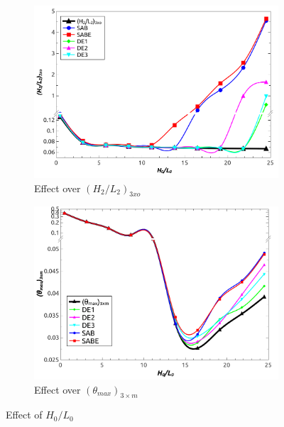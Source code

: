 \documentclass[10pt,fleqn,a4paper,twoside]{article}
\begin{document}
\begin{figure}[h]
\centering
	\begin{subfigure}{0.52\textwidth}
		\centering
		\includegraphics[width=1\linewidth]{imgs/h0l0_h2l2_en.png}
		\caption{ {\small Effect over $(H_{2}/L_{2})_{3xo}$}}
		\label{figure02:sub1}
	\end{subfigure}%
	\begin{subfigure}{0.52\textwidth}
		\centering
		\includegraphics[width=1\linewidth]{imgs/h0l0_tmim_en}
		\caption{ {\small Effect over $({\theta}_{max})_{3\times m}$}}
		\label{figure02:sub2}
	\end{subfigure}%
\caption{Effect of $H_{0}/L_{0}$}
\label{figure02}
\end{figure}
\end{document}
